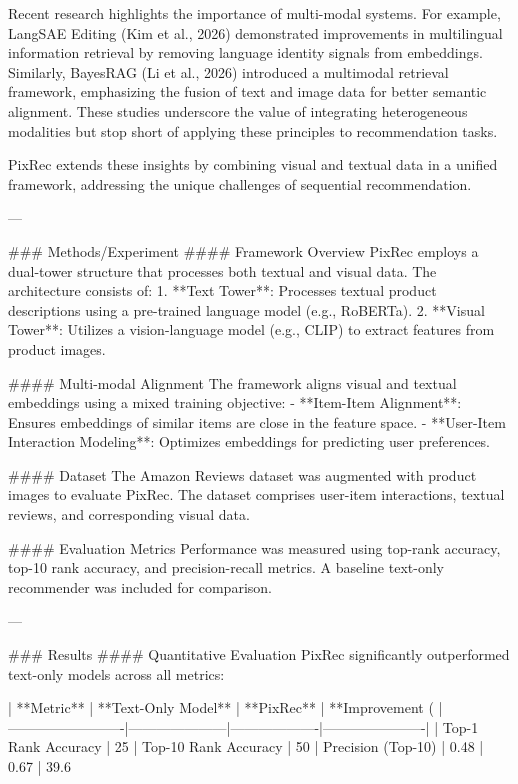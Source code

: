 Recent research highlights the importance of multi-modal systems. For example, LangSAE Editing (Kim et al., 2026) demonstrated improvements in multilingual information retrieval by removing language identity signals from embeddings. Similarly, BayesRAG (Li et al., 2026) introduced a multimodal retrieval framework, emphasizing the fusion of text and image data for better semantic alignment. These studies underscore the value of integrating heterogeneous modalities but stop short of applying these principles to recommendation tasks.  

PixRec extends these insights by combining visual and textual data in a unified framework, addressing the unique challenges of sequential recommendation.

---

### Methods/Experiment  
#### Framework Overview  
PixRec employs a dual-tower structure that processes both textual and visual data. The architecture consists of:  
1. **Text Tower**: Processes textual product descriptions using a pre-trained language model (e.g., RoBERTa).  
2. **Visual Tower**: Utilizes a vision-language model (e.g., CLIP) to extract features from product images.  

#### Multi-modal Alignment  
The framework aligns visual and textual embeddings using a mixed training objective:  
- **Item-Item Alignment**: Ensures embeddings of similar items are close in the feature space.  
- **User-Item Interaction Modeling**: Optimizes embeddings for predicting user preferences.  

#### Dataset  
The Amazon Reviews dataset was augmented with product images to evaluate PixRec. The dataset comprises user-item interactions, textual reviews, and corresponding visual data.  

#### Evaluation Metrics  
Performance was measured using top-rank accuracy, top-10 rank accuracy, and precision-recall metrics. A baseline text-only recommender was included for comparison.  

---

### Results  
#### Quantitative Evaluation  
PixRec significantly outperformed text-only models across all metrics:  

| **Metric**             | **Text-Only Model** | **PixRec**        | **Improvement (%
|-------------------------|---------------------|-------------------|----------------------|
| Top-1 Rank Accuracy     | 25%
| Top-10 Rank Accuracy    | 50%
| Precision (Top-10)      | 0.48               | 0.67             | 39.6%

